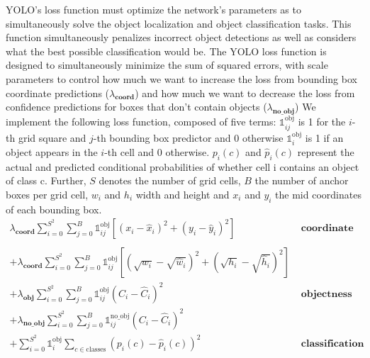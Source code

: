 \documentclass[a4paper]{article}
\begin{document}
YOLO’s loss function must optimize the network's parameters as to simultaneously solve the object localization and object classification tasks. This function
simultaneously penalizes incorrect object detections
as well as considers what the best possible classification
would be. The YOLO loss function is designed to simultaneously minimize the sum of squared errors, with scale parameters to control how much we want to increase the loss from bounding box coordinate predictions ($\lambda_\textbf{coord}$) and how much we want to decrease the loss from confidence predictions for boxes that don’t contain objects ($\lambda_\textbf{no\_obj}$) We
implement the following loss function, composed of five
terms:
${\mathbb{1}}_{ij}^{\text{obj}}$ is 1 for the $i$-th grid square and $j$-th bounding box predictor and 0 otherwise ${{\mathbb{1}}}_i^{\text{obj}}$ is 1 if an object appears in the $i$-th cell and 0 otherwise.
$p_i(c)$ and $\hat{p}_i(c)$ represent the actual and predicted conditional probabilities of whether cell i contains an object of class c.
Further, $S$ denotes the number of grid cells, $B$ the number of anchor boxes per grid cell, $w_i$ and $h_i$ width and height and $x_i$ and $y_i$ the mid coordinates of each bounding box.
\begin{align*}
\lambda_\textbf{coord}
\sum_{i = 0}^{S^2}
    \sum_{j = 0}^{B}
     {\mathbb{1}}_{ij}^{\text{obj}}
            \left[
            \left(
                x_i - \hat{x}_i
            \right)^2 +
            \left(
                y_i - \hat{y}_i
            \right)^2
            \right]&\textbf{\ coordinate loss}
\\\\
+ \lambda_\textbf{coord} 
\sum_{i = 0}^{S^2}
    \sum_{j = 0}^{B}
         {\mathbb{1}}_{ij}^{\text{obj}}
         \left[
        \left(
            \sqrt{w_i} - \sqrt{\hat{w}_i}
        \right)^2 +
        \left(
            \sqrt{h_i} - \sqrt{\hat{h}_i}
        \right)^2
        \right]\\
+ \lambda_\textbf{obj}\sum_{i = 0}^{S^2}
    \sum_{j = 0}^{B}
        {\mathbb{1}}_{ij}^{\text{obj}}
        \left(
            C_i - \hat{C}_i
        \right)^2&\textbf{\ objectness loss}
\\
+ \lambda_\textbf{no\_obj}
\sum_{i = 0}^{S^2}
    \sum_{j = 0}^{B}
    {\mathbb{1}}_{ij}^{\text{no\_obj}}
        \left(
            C_i - \hat{C}_i
        \right)^2\\ 
+ \sum_{i = 0}^{S^2}
{{\mathbb{1}}}_i^{\text{obj}}
    \sum_{c \in \textrm{classes}}
        \left(
            p_i(c) - \hat{p}_i(c)
        \right)^2&\textbf{\ classification loss}
\end{align*}
\end{document}
